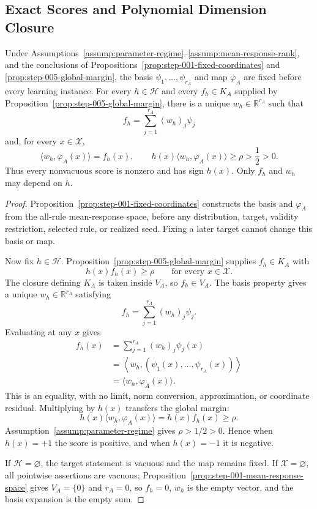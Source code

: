 \subsection{Exact Scores and Polynomial Dimension Closure}
\label{app:step-006}

\begin{proposition}
\label{prop:step-006-exact-score-transfer}
Under Assumptions~\ref{assump:parameter-regime}--\ref{assump:mean-response-rank},
and the conclusions of Propositions~\ref{prop:step-001-fixed-coordinates} and
\ref{prop:step-005-global-margin}, the basis
\(\psi_1,\ldots,\psi_{r_A}\) and map \(\varphi_A\) are fixed before every
learning instance.  For every \(h\in\mathcal H\) and every \(f_h\in K_A\)
supplied by Proposition~\ref{prop:step-005-global-margin}, there is a unique
\(w_h\in\mathbb R^{r_A}\) such that
\[
f_h=\sum_{j=1}^{r_A}(w_h)_j\psi_j
\]
and, for every \(x\in\mathcal X\),
\[
\langle w_h,\varphi_A(x)\rangle=f_h(x),
\qquad
h(x)\langle w_h,\varphi_A(x)\rangle
\ge\rho>\frac12>0.
\]
Thus every nonvacuous score is nonzero and has sign \(h(x)\).  Only
\(f_h\) and \(w_h\) may depend on \(h\).
\end{proposition}

\begin{proof}
Proposition~\ref{prop:step-001-fixed-coordinates} constructs the basis and
\(\varphi_A\) from the all-rule mean-response space, before any distribution,
target, validity restriction, selected rule, or realized seed.  Fixing a
later target cannot change this basis or map.

Now fix \(h\in\mathcal H\).  Proposition~\ref{prop:step-005-global-margin}
supplies \(f_h\in K_A\) with
\[
h(x)f_h(x)\ge\rho
\qquad\text{for every }x\in\mathcal X.
\]
The closure defining \(K_A\) is taken inside \(V_A\), so \(f_h\in V_A\).
The basis property gives a unique \(w_h\in\mathbb R^{r_A}\) satisfying
\[
f_h=\sum_{j=1}^{r_A}(w_h)_j\psi_j.
\]
Evaluating at any \(x\) gives
\[
\begin{aligned}
f_h(x)
&=\sum_{j=1}^{r_A}(w_h)_j\psi_j(x)\\
&=\left\langle w_h,
(\psi_1(x),\ldots,\psi_{r_A}(x))\right\rangle\\
&=\langle w_h,\varphi_A(x)\rangle.
\end{aligned}
\]
This is an equality, with no limit, norm conversion, approximation, or
coordinate residual.  Multiplying by \(h(x)\) transfers the global margin:
\[
h(x)\langle w_h,\varphi_A(x)\rangle
=h(x)f_h(x)\ge\rho.
\]
Assumption~\ref{assump:parameter-regime} gives \(\rho>1/2>0\).  Hence when
\(h(x)=+1\) the score is positive, and when \(h(x)=-1\) it is negative.

If \(\mathcal H=\varnothing\), the target statement is vacuous and the map
remains fixed.  If \(\mathcal X=\varnothing\), all pointwise assertions are
vacuous; Proposition~\ref{prop:step-001-mean-response-space} gives
\(V_A=\{0\}\) and \(r_A=0\), so \(f_h=0\), \(w_h\) is the empty vector, and
the basis expansion is the empty sum.
\end{proof}

